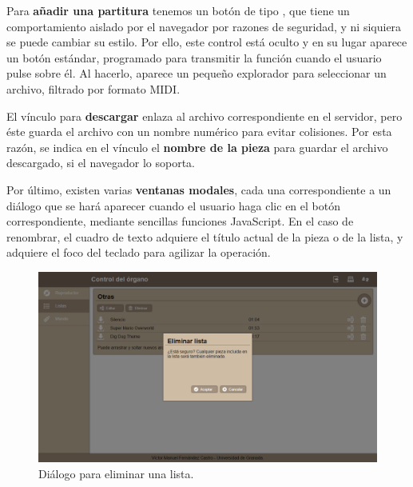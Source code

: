 \smallskip

Para \textbf{añadir una partitura} tenemos un botón de tipo , que tiene un comportamiento aislado por el navegador por razones de seguridad, y ni siquiera se puede cambiar su estilo. Por ello, este control está oculto y en su lugar aparece un botón  estándar, programado para transmitir la función  cuando el usuario pulse sobre él. Al hacerlo, aparece un pequeño explorador para seleccionar un archivo, filtrado por formato \acrshort{MIDI}.

El vínculo para \textbf{descargar} enlaza al archivo correspondiente en el servidor, pero éste guarda el archivo con un nombre numérico para evitar colisiones. Por esta razón, se indica en el vínculo el \textbf{nombre de la pieza} para guardar el archivo descargado, si el navegador lo soporta.

Por último, existen varias \textbf{ventanas modales}, cada una correspondiente a un diálogo que se hará aparecer cuando el usuario haga clic en el botón correspondiente, mediante sencillas funciones JavaScript. En el caso de renombrar, el cuadro de texto adquiere el título actual de la pieza o de la lista, y adquiere el foco del teclado para agilizar la operación.

\smallskip

\begin{figure}[H]
	\noindent \begin{centering}
		\includegraphics[width=\linewidth*3/4]{capitulo5/cap_elim_lista}
		\par\end{centering}
	\smallskip
	\caption{\label{fig:cap_elim_lista} Diálogo para eliminar una lista.}
\end{figure} 

\smallskip


